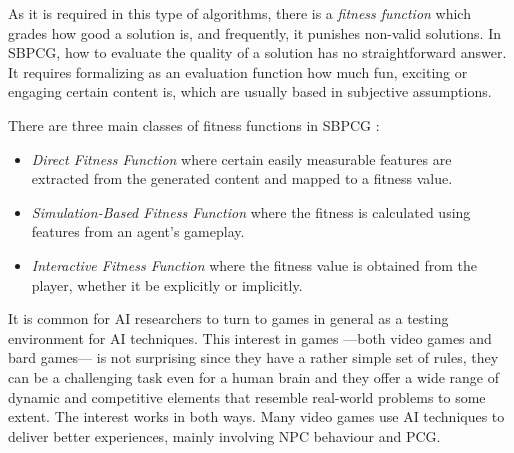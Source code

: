 \documentclass[runningheads,a4paper]{llncs}
\begin{document}
As it is required in this type of algorithms, there is a \textit{fitness function} which grades how good a solution is, and frequently, it punishes non-valid solutions. 
In SBPCG, how to evaluate the quality of a solution has no straightforward 
answer. It requires formalizing as an evaluation function how much fun, 
exciting or engaging certain content is, which are usually based in subjective 
assumptions.

There are three main classes of fitness functions in 
SBPCG \cite{togelius2010search}:

\begin{itemize}
	\item \textit{Direct Fitness Function} where certain easily measurable 
	features are extracted from the generated content and mapped to a 
	fitness value.
	\item \textit{Simulation-Based Fitness Function} where the 
	fitness is calculated using features from an agent's gameplay. 
	\item \textit{Interactive Fitness Function} where the fitness value is 
	obtained from the player, whether it be explicitly or 
	implicitly. 
\end{itemize}

 


It is common for AI researchers to turn to games in general as a testing 
environment for AI techniques.
This interest in games ---both video games and bard games--- is not 
surprising since they have a rather simple set of rules, they can be a 
challenging task even for a human brain and they offer a wide range of dynamic 
and competitive elements that resemble real-world problems to some extent. The 
interest works in both ways. Many video games use AI techniques to deliver 
better experiences, mainly involving NPC behaviour and PCG.
\end{document}
